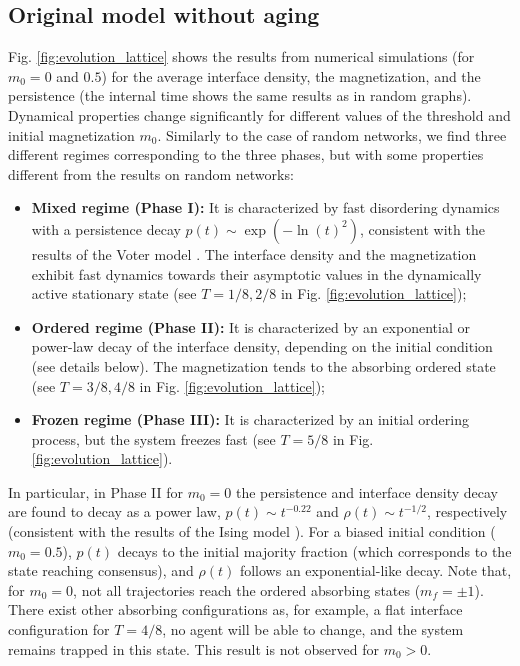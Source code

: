 \subsection{Original model without aging}

Fig. \ref{fig:evolution_lattice} shows the results from numerical simulations (for $m_0 = 0$ and $0.5$) for the average interface density, the magnetization, and the persistence (the internal time shows the same results as in random graphs). Dynamical properties change significantly for different values of the threshold and initial magnetization $m_0$. Similarly to the case of random networks, we find three different regimes corresponding to the three phases, but with some properties different from the results on  random networks:
\begin{itemize}
	\item \textbf{Mixed regime (Phase I):} It is characterized by fast disordering dynamics with a persistence decay $p(t) \sim \exp(- \ln(t)^2)$, consistent with the results of the Voter model \cite{ben-naim-1996}. The interface density and the magnetization exhibit fast dynamics towards their asymptotic values in the dynamically active stationary state (see $T = 1/8,2/8$ in Fig. \ref{fig:evolution_lattice});
	\item \textbf{Ordered regime (Phase II):} It is characterized by an exponential or power-law decay of the interface density, depending on the initial condition (see details below). The magnetization tends to the absorbing ordered state (see $T = 3/8,4/8$ in Fig. \ref{fig:evolution_lattice});
	\item \textbf{Frozen regime (Phase III):} It is characterized by an initial ordering process, but the system freezes fast (see $T = 5/8$ in Fig. \ref{fig:evolution_lattice}).
\end{itemize}

In particular, in Phase II for $m_0 = 0$ the persistence and interface density decay are found to decay as a power law, $p(t) \sim t^{-0.22}$ and $\rho(t) \sim t^{-1/2}$, respectively (consistent with the results of the Ising model \cite{stauffer-1994,derrida-1995A,derrida-1995B,derrida-1997}). For a biased initial condition ($m_0 = 0.5$), $p(t)$ decays to the initial majority fraction (which corresponds to the state reaching consensus), and $\rho(t)$ follows an exponential-like decay. Note that, for $m_0 = 0$, not all trajectories reach the ordered absorbing states ($m_f=\pm 1$). There exist other absorbing configurations as, for example,  a flat interface configuration for $T = 4/8$, no agent will be able to change, and the system remains trapped in this state. This result is not observed for $m_0 > 0$.

